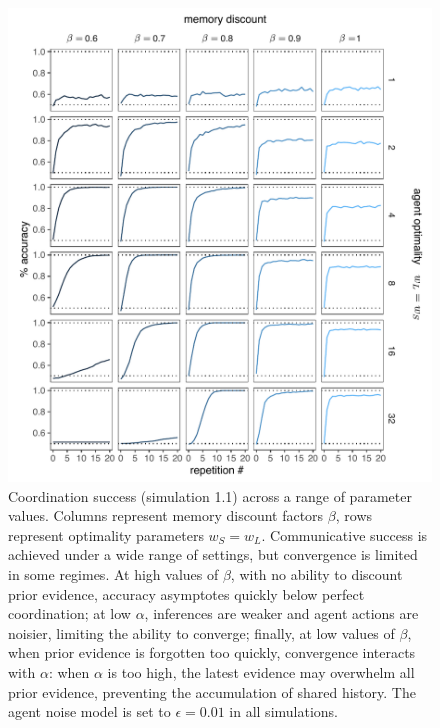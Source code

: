 \documentclass[11pt, floatsintext]{apa6}
\begin{document}
 \begin{figure}
\centering
    \includegraphics[scale=.9]{arbitrariness_grid.pdf}
  \caption{Coordination success (simulation 1.1) across a range of parameter values. Columns represent memory discount factors $\beta$, rows represent optimality parameters $w_S = w_L$. Communicative success is achieved under a wide range of settings, but convergence is limited in some regimes. At high values of $\beta$, with no ability to discount prior evidence, accuracy asymptotes quickly below perfect coordination; at low $\alpha$, inferences are weaker and agent actions are noisier, limiting the ability to converge; finally, at low values of $\beta$, when prior evidence is forgotten too quickly, convergence interacts with $\alpha$: when $\alpha$ is too high, the latest evidence may overwhelm all prior evidence, preventing the accumulation of shared history. The agent noise model is set to $\epsilon = 0.01$ in all simulations.}
  \label{fig:arbitrariness_grid}
\end{figure}
\end{document}
